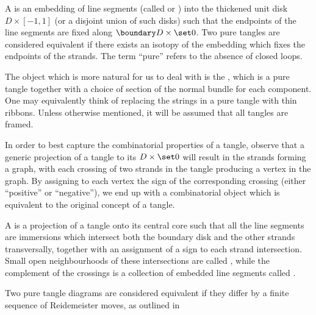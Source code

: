 \begin{definition}
        A  is an embedding of line segments (called
         or ) into the thickened unit disk
        $D \times [-1,1]$ (or a disjoint union of such disks) such that the
        endpoints of the line segments are fixed along
        $\boundary D \times \set0$. Two pure tangles are considered equivalent
        if there exists an isotopy of the embedding which fixes the endpoints of
        the strands. The term \enquote{pure} refers to the absence of closed
        loops.
\end{definition}

\begin{definition}
        The object which is more natural for us to deal with is the , which is a pure tangle together with a choice of section of the
        normal bundle for each component. One may equivalently think of
        replacing the strings in a pure tangle with thin ribbons. Unless
        otherwise mentioned, it will be assumed that all tangles are framed.
\end{definition}

In order to best capture the combinatorial properties of a tangle, observe that
a generic projection of a tangle to its  $D\times \set 0$
will result in the strands forming a graph, with each crossing of two strands in
the tangle producing a vertex in the graph. By assigning to each vertex the sign
of the corresponding crossing (either \enquote{positive} or \enquote{negative}),
we end up with a combinatorial object which is equivalent to the original
concept of a tangle.

\begin{definition}\label{def:pure_tangle_diagram}
        A  is a projection of a tangle onto its
        central core such that all the line segments are immersions which
        intersect both the boundary disk and the other strands transversally,
        together with an assignment of a sign to each strand intersection.
        Small open neighbourhoods of these intersections are called
        , while the complement of the crossings is a collection
        of embedded line segments called .

        Two pure tangle diagrams are considered equivalent if they differ by a
        finite sequence of Reidemeister moves, as outlined in
\end{definition}


